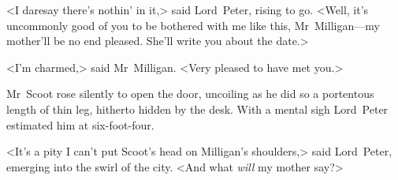 <I daresay there's nothin' in it,> said Lord~Peter, rising to go. <Well, it's uncommonly good of you to be bothered with me like this, Mr~Milligan—my mother'll be no end pleased. She'll write you about the date.>

<I'm charmed,> said Mr~Milligan. <Very pleased to have met you.>

Mr~Scoot rose silently to open the door, uncoiling as he did so a portentous length of thin leg, hitherto hidden by the desk. With a mental sigh Lord~Peter estimated him at six-foot-four.

<It's a pity I can't put Scoot's head on Milligan's shoulders,> said Lord~Peter, emerging into the swirl of the city. <And what \textit{will} my mother say?>